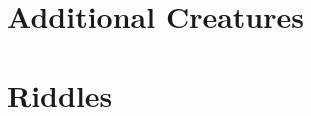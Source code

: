 \renewcommand{\headingtype}{APPENDIX}

\chapter{Additional Creatures}
\label{undeadstats}

\begin{multicols}{2}




\end{multicols}

\chapter{Riddles}
\label{riddles}

